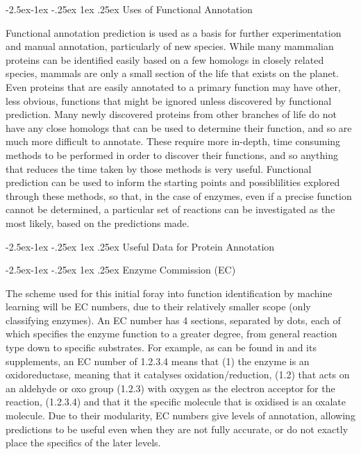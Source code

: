 \documentclass[12pt]{article}
\makeatletter
\renewcommand\subsubsection{\@startsection{subsubsection}{4}{\z@}
            {-2.5ex\@plus -1ex \@minus -.25ex}
            {1ex \@plus .25ex}
            {\normalfont\large\bfseries}}
\renewcommand\subsection{\@startsection{subsection}{4}{\z@}
            {-2.5ex\@plus -1ex \@minus -.25ex}
            {1ex \@plus .25ex}
            {\normalfont\Large\bfseries}}
\makeatother
\begin{document}
			\subsubsection{Uses of Functional Annotation}		
		
			Functional annotation prediction is used as a basis for further experimentation and manual annotation, particularly of new species.  While many mammalian proteins can be identified easily based on a few homologs in closely related species, mammals are only a small section of the life that exists on the planet.  Even proteins that are easily annotated to a primary function may have other, less obvious, functions that might be ignored unless discovered by functional prediction.  Many newly discovered proteins from other branches of life do not have any close homologs that can be used to determine their function, and so are much more difficult to annotate.  These require more in-depth, time consuming methods to be performed in order to discover their functions, and so anything that reduces the time taken by those methods is very useful.  Functional prediction can be used to inform the starting points and possiblilities explored through these methods, so that, in the case of enzymes, even if a precise function cannot be determined, a particular set of reactions can be investigated as the most likely, based on the predictions made.  
			
		\subsection{Useful Data for Protein Annotation}  
			
			\subsubsection{Enzyme Commission (EC)}

			The scheme used for this initial foray into function identification by machine learning will be EC numbers, due to their relatively smaller scope (only classifying enzymes).  An EC number has 4 sections, separated by dots, each of which specifies the enzyme function to a greater degree, from general reaction type down to specific substrates. For example, as can be found in \cite{RefWorks:doc:5d70e98ce4b0ef464262611a} and its supplements, an EC number of 1.2.3.4 means that (1) the enzyme is an oxidoreductase, meaning that it catalyses oxidation/reduction, (1.2) that acts on an aldehyde or oxo group (1.2.3) with oxygen as the electron acceptor for the reaction, (1.2.3.4) and that it the specific molecule that is oxidised is an oxalate molecule.  Due to their modularity, EC numbers give levels of annotation, allowing predictions to be useful even when they are not fully accurate, or do not exactly place the specifics of the later levels.
			
\end{document}
